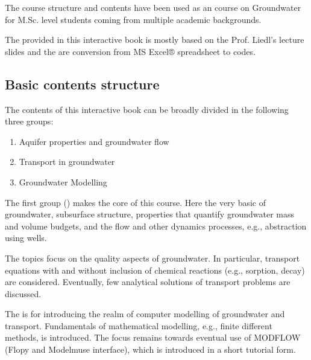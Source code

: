 \documentclass[letterpaper,10pt,english]{sphinxmanual}
\begin{document}
The course structure and contents have been used as an  course on Groundwater for M.Sc. level students coming from multiple academic backgrounds.

The  provided in this interactive book is mostly based on the Prof. Liedl’s lecture slides and the  are conversion from MS Excel® spreadsheet to  codes.
\begin{quote}

\end{quote}


\subsection{Basic contents structure}
\label{\detokenize{contents/background/00_general:basic-contents-structure}}
The contents of this interactive book can be broadly divided in the following three groups:
\begin{enumerate}
%
\item {} 
Aquifer properties and groundwater flow

\item {} 
Transport in groundwater

\item {} 
Groundwater Modelling

\end{enumerate}

The first group () makes the core of this course. Here the very basic of groundwater, subsurface structure, properties that quantify groundwater mass and volume budgets, and the flow and other dynamics processes, e.g., abstraction using wells.

The  topics focus on the quality aspects of groundwater. In particular, transport equations with and without inclusion of chemical reactions (e.g., sorption, decay) are considered. Eventually, few analytical solutions of transport problems are discussed.

The  is for introducing the realm of computer modelling of groundwater and transport. Fundamentals of mathematical modelling, e.g., finite different methods, is introduced. The focus remains towards eventual use of MODFLOW (Flopy and Modelmuse interface), which is introduced in a short tutorial form.
\end{document}
